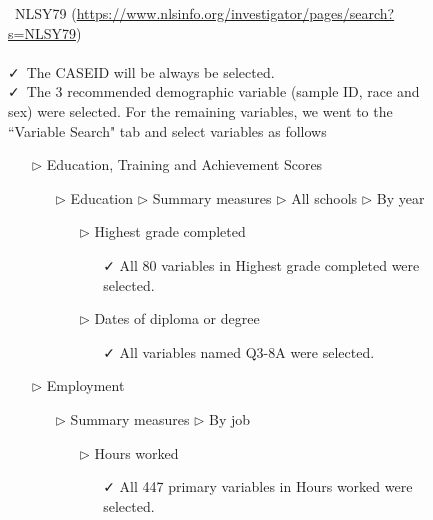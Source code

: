 \documentclass[12pt]{article}
\begin{document}
\begin{figure}[p]

\begin{tcolorbox}[title = Navigating the data source, fontupper=\linespread{.8}\selectfont]
\vspace{3mm}
\faDatabase\ NLSY79 (\url{https://www.nlsinfo.org/investigator/pages/search?s=NLSY79})\\\\
\vspace{3mm}
\faCheck\ The CASEID will be always be selected.  \\
\vspace{1mm}
\faCheck\ The 3 recommended demographic variable (sample ID, race and sex) were selected.  For the remaining variables, we went to the ``Variable Search" tab and select variables as follows
\begin{itemize}
\item[$\triangleright$] Education, Training and Achievement Scores
\begin{itemize}
\item[$\triangleright$] Education $\triangleright$ Summary measures $\triangleright$ All schools $\triangleright$ By year
\begin{itemize}
\item[$\triangleright$] Highest grade completed
\begin{itemize}
\item[\faCheck] All 80 variables in Highest grade completed were selected.
\end{itemize}
\end{itemize}
\begin{itemize}
\item[$\triangleright$] Dates of diploma or degree
\begin{itemize}
\item[\faCheck] All variables named Q3-8A were selected.
\end{itemize}
\end{itemize}
\end{itemize}
\item[$\triangleright$] Employment
\begin{itemize}
\item[$\triangleright$] Summary measures $\triangleright$ By job
\begin{itemize}
\item[$\triangleright$] Hours worked  
\begin{itemize}
\item[\faCheck] All 447 primary variables in Hours worked were selected.

\end{itemize}
\end{itemize}
\end{itemize}
\end{itemize}
\end{tcolorbox}
\end{figure}
\end{document}
